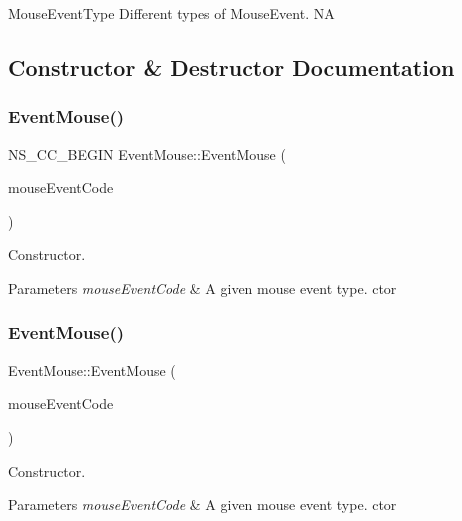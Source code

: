 Mouse\+Event\+Type Different types of Mouse\+Event.  NA 

\subsection{Constructor \& Destructor Documentation}
\mbox{\label{classEventMouse_a7b964fea12b1e49f3fd13852be60d841}} 
\subsubsection{\texorpdfstring{Event\+Mouse()}{EventMouse()}\hspace{0.1cm}{\footnotesize\ttfamily [1/2]}}
{\footnotesize\ttfamily N\+S\+\_\+\+C\+C\+\_\+\+B\+E\+G\+IN Event\+Mouse\+::\+Event\+Mouse (\begin{DoxyParamCaption}\item[{\hyperlink{classEventMouse_a6a96ce5df8674cbaf01b74d2f17f213c}{Mouse\+Event\+Type}}]{mouse\+Event\+Code }\end{DoxyParamCaption})}

Constructor.


\begin{DoxyParams}{Parameters}
{\em mouse\+Event\+Code} & A given mouse event type.  ctor \\
\hline
\end{DoxyParams}
\mbox{\label{classEventMouse_a0334f9666800853da6ba94df7af4ca3f}} 
\subsubsection{\texorpdfstring{Event\+Mouse()}{EventMouse()}\hspace{0.1cm}{\footnotesize\ttfamily [2/2]}}
{\footnotesize\ttfamily Event\+Mouse\+::\+Event\+Mouse (\begin{DoxyParamCaption}\item[{\hyperlink{classEventMouse_a6a96ce5df8674cbaf01b74d2f17f213c}{Mouse\+Event\+Type}}]{mouse\+Event\+Code }\end{DoxyParamCaption})}

Constructor.


\begin{DoxyParams}{Parameters}
{\em mouse\+Event\+Code} & A given mouse event type.  ctor \\
\hline
\end{DoxyParams}


